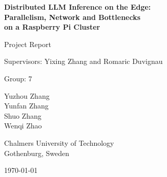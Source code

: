 \documentclass[11pt,a4paper]{article}
\begin{document}
\begin{titlepage}
  \centering
  \vspace*{2cm}
  {\LARGE\bfseries Distributed LLM Inference on the Edge:\\[0.4em]
   Parallelism, Network and Bottlenecks\\[0.4em]
   on a Raspberry Pi Cluster\par}
  \vspace{2cm}
  {\large Project Report\par}
  {\large Supervisors: Yixing Zhang and Romaric Duvignau\par}
  {\large Group: 7\par}
  \vspace{1.5cm}
  {\large Yuzhou Zhang\\ Yunfan Zhang\\ Shuo Zhang\\ Wenqi Zhao\par}
  \vfill
  {\large Chalmers University of Technology\\
   Gothenburg, Sweden\par}
  \vspace{0.5cm}
  {\large \today\par}
\end{titlepage}
\end{document}
